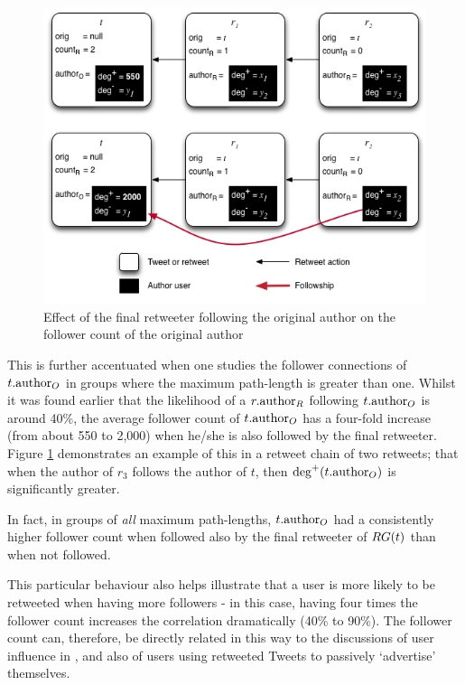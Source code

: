 \begin{figure}[h]
\centering
\includegraphics[scale=0.7]{3.Chapter1/Media/final_following_original.png} 
\caption{Effect of the final retweeter following the original author on the follower count of the original author}
\label{fig:final_following_original}
\end{figure}

This is further accentuated when one studies the follower connections of $t.\textrm{author}_O$ in groups where the maximum path-length is greater than one. Whilst it was found earlier that the likelihood of a $r.\textrm{author}_R$ following $t.\textrm{author}_O$ is around 40\%, the average follower count of $t.\textrm{author}_O$ has a four-fold increase (from about 550 to 2,000) when he/she is also followed by the final retweeter. Figure \ref{fig:final_following_original} demonstrates an example of this in a retweet chain of two retweets; that when the author of $r_3$ follows the author of $t$, then $\textrm{deg}^+(t.\textrm{author}_O)$ is significantly greater. 

In fact, in groups of \textit{all} maximum path-lengths, $t.\textrm{author}_O$ had a consistently higher follower count when followed also by the final retweeter of $RG(t)$ than when not followed.

This particular behaviour also helps illustrate that a user is more likely to be retweeted when having more followers - in this case, having four times the follower count increases the correlation dramatically (40\% to 90\%). The follower count can, therefore, be directly related in this way to the discussions of user influence in \cite{cha10}, and also of users using retweeted Tweets to passively `advertise' themselves.

